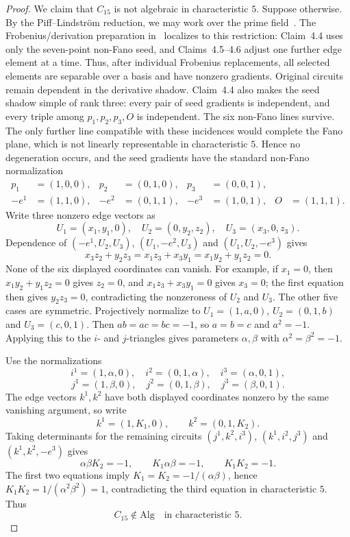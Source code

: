 \documentclass[11pt]{article}
\theoremstyle{definition}
\newcommand{\Alg}{\mathrm{Alg}}
\begin{document}
\begin{proof}
We claim that $C_{15}$ is not algebraic in characteristic $5$.  Suppose otherwise.  By the Piff--Lindstr\"om reduction, we may work over the prime field~\cite[Theorem~2.3]{BenEfraim2016}.  The Frobenius/derivation preparation in~\cite[Lemma~4.3 and Claims~4.4--4.6]{BenEfraim2016} localizes to this restriction: Claim~4.4 uses only the seven-point non-Fano seed, and Claims~4.5--4.6 adjust one further edge element at a time.  Thus, after individual Frobenius replacements, all selected elements are separable over a basis and have nonzero gradients.  Original circuits remain dependent in the derivative shadow.  Claim~4.4 also makes the seed shadow simple of rank three: every pair of seed gradients is independent, and every triple among $p_1,p_2,p_3,O$ is independent.  The six non-Fano lines survive.  The only further line compatible with these incidences would complete the Fano plane, which is not linearly representable in characteristic $5$.  Hence no degeneration occurs, and the seed gradients have the standard non-Fano normalization
\[
\begin{aligned}
p_1&=(1,0,0),&p_2&=(0,1,0),&p_3&=(0,0,1),\\
-e^1&=(1,1,0),&-e^2&=(0,1,1),&-e^3&=(1,0,1),&O&=(1,1,1).
\end{aligned}
\]
Write three nonzero edge vectors as
\[
U_1=(x_1,y_1,0),\quad U_2=(0,y_2,z_2),\quad U_3=(x_3,0,z_3).
\]
Dependence of $(-e^1,U_2,U_3)$, $(U_1,-e^2,U_3)$ and $(U_1,U_2,-e^3)$ gives
\[
x_3z_2+y_2z_3=x_1z_3+x_3y_1=x_1y_2+y_1z_2=0.
\]
None of the six displayed coordinates can vanish.  For example, if $x_1=0$, then $x_1y_2+y_1z_2=0$ gives $z_2=0$, and $x_1z_3+x_3y_1=0$ gives $x_3=0$; the first equation then gives $y_2z_3=0$, contradicting the nonzeroness of $U_2$ and $U_3$.  The other five cases are symmetric.  Projectively normalize to
$U_1=(1,a,0)$, $U_2=(0,1,b)$ and $U_3=(c,0,1)$.  Then $ab=ac=bc=-1$, so $a=b=c$ and $a^2=-1$.  Applying this to the $i$- and $j$-triangles gives parameters $\alpha,\beta$ with $\alpha^2=\beta^2=-1$.

Use the normalizations
\[
i^1=(1,\alpha,0),\quad i^2=(0,1,\alpha),\quad i^3=(\alpha,0,1),
\]
\[
j^1=(1,\beta,0),\quad j^2=(0,1,\beta),\quad j^3=(\beta,0,1).
\]
The edge vectors $k^1,k^2$ have both displayed coordinates nonzero by the same vanishing argument, so write
\[
k^1=(1,K_1,0),\qquad k^2=(0,1,K_2).
\]
Taking determinants for the remaining circuits $(j^1,k^2,i^3)$, $(k^1,i^2,j^3)$ and $(k^1,k^2,-e^3)$ gives
\[
\alpha\beta K_2=-1,\qquad K_1\alpha\beta=-1,\qquad K_1K_2=-1.
\]
The first two equations imply $K_1=K_2=-1/(\alpha\beta)$, hence $K_1K_2=1/(\alpha^2\beta^2)=1$, contradicting the third equation in characteristic $5$.  Thus
\begin{equation}\label{eq:c15-nonalg}
C_{15}\notin\Alg\quad\text{in characteristic }5.
\end{equation}


\end{proof}
\end{document}
